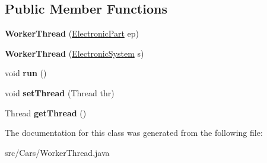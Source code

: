 \subsection*{Public Member Functions}
\begin{DoxyCompactItemize}
\item 
\hypertarget{classCars_1_1WorkerThread_a80938fed607c3ed72bc62aa3fea38668}{}{\bfseries Worker\+Thread} (\hyperlink{classCars_1_1ElectronicPart}{Electronic\+Part} ep)\label{classCars_1_1WorkerThread_a80938fed607c3ed72bc62aa3fea38668}

\item 
\hypertarget{classCars_1_1WorkerThread_ac1c921d1df056143278f80f61e61876f}{}{\bfseries Worker\+Thread} (\hyperlink{classCars_1_1ElectronicSystem}{Electronic\+System} s)\label{classCars_1_1WorkerThread_ac1c921d1df056143278f80f61e61876f}

\item 
\hypertarget{classCars_1_1WorkerThread_a0e258ed49726752d0ab24052e1c741cf}{}void {\bfseries run} ()\label{classCars_1_1WorkerThread_a0e258ed49726752d0ab24052e1c741cf}

\item 
\hypertarget{classCars_1_1WorkerThread_abe9783d3f3939e056e8af47ba8007c81}{}void {\bfseries set\+Thread} (Thread thr)\label{classCars_1_1WorkerThread_abe9783d3f3939e056e8af47ba8007c81}

\item 
\hypertarget{classCars_1_1WorkerThread_afebe58d37591400d2ed6b676cde24a73}{}Thread {\bfseries get\+Thread} ()\label{classCars_1_1WorkerThread_afebe58d37591400d2ed6b676cde24a73}

\end{DoxyCompactItemize}


The documentation for this class was generated from the following file\+:\begin{DoxyCompactItemize}
\item 
src/\+Cars/Worker\+Thread.\+java\end{DoxyCompactItemize}
